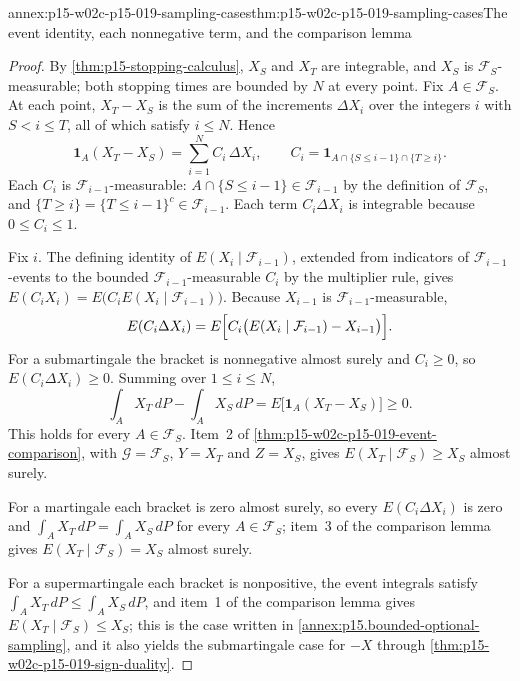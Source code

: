 \begin{annexitem}{annex:p15-w02c-p15-019-sampling-cases}{thm:p15-w02c-p15-019-sampling-cases}{The event identity, each nonnegative term, and the comparison lemma}
\begin{proof}
By \cref{thm:p15-stopping-calculus}, \(X_S\) and \(X_T\) are integrable,
and \(X_S\) is \(\mathcal F_S\)-measurable; both stopping times are
bounded by \(N\) at every point. Fix \(A\in\mathcal F_S\). At each
point, \(X_T-X_S\) is the sum of the increments \(\Delta X_i\) over the
integers \(i\) with \(S<i\leq T\), all of which satisfy \(i\leq N\).
Hence
\[
 \mathbf1_A(X_T-X_S)=\sum_{i=1}^NC_i\,\Delta X_i,
 \qquad C_i=\mathbf1_{A\cap\{S\leq i-1\}\cap\{T\geq i\}} .
\]
Each \(C_i\) is \(\mathcal F_{i-1}\)-measurable:
\(A\cap\{S\leq i-1\}\in\mathcal F_{i-1}\) by the definition of
\(\mathcal F_S\), and \(\{T\geq i\}=\{T\leq i-1\}^c\in\mathcal F_{i-1}\).
Each term \(C_i\Delta X_i\) is integrable because \(0\leq C_i\leq1\).

Fix \(i\). The defining identity of \(E(X_i\mid\mathcal F_{i-1})\),
extended from indicators of \(\mathcal F_{i-1}\)-events to the bounded
\(\mathcal F_{i-1}\)-measurable \(C_i\) by the multiplier rule, gives
\(E(C_iX_i)=E\bigl(C_iE(X_i\mid\mathcal F_{i-1})\bigr)\). Because
\(X_{i-1}\) is \(\mathcal F_{i-1}\)-measurable,
\[
 E(C_i\Delta X_i)
   =E\Bigl[C_i\bigl(E(X_i\mid\mathcal F_{i-1})-X_{i-1}\bigr)\Bigr].
\]
For a submartingale the bracket is nonnegative almost surely and
\(C_i\geq0\), so \(E(C_i\Delta X_i)\geq0\). Summing over
\(1\leq i\leq N\),
\[
 \int_AX_T\,dP-\int_AX_S\,dP=E\bigl[\mathbf1_A(X_T-X_S)\bigr]\geq0 .
\]
This holds for every \(A\in\mathcal F_S\). Item~2 of
\cref{thm:p15-w02c-p15-019-event-comparison}, with
\(\mathcal G=\mathcal F_S\), \(Y=X_T\) and \(Z=X_S\), gives
\(E(X_T\mid\mathcal F_S)\geq X_S\) almost surely.

For a martingale each bracket is zero almost surely, so every
\(E(C_i\Delta X_i)\) is zero and \(\int_AX_T\,dP=\int_AX_S\,dP\) for every
\(A\in\mathcal F_S\); item~3 of the comparison lemma gives
\(E(X_T\mid\mathcal F_S)=X_S\) almost surely.

For a supermartingale each bracket is nonpositive, the event integrals
satisfy \(\int_AX_T\,dP\leq\int_AX_S\,dP\), and item~1 of the
comparison lemma gives \(E(X_T\mid\mathcal F_S)\leq X_S\); this is the
case written in \cref{annex:p15.bounded-optional-sampling}, and it also
yields the submartingale case for \(-X\) through
\cref{thm:p15-w02c-p15-019-sign-duality}.
\end{proof}
\end{annexitem}


